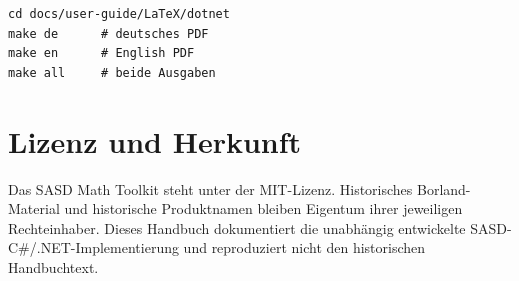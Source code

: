 \documentclass[11pt,a4paper,twoside,openright]{book}
\begin{document}
\begin{lstlisting}
cd docs/user-guide/LaTeX/dotnet
make de      # deutsches PDF
make en      # English PDF
make all     # beide Ausgaben
\end{lstlisting}

\backmatter
\chapter*{Lizenz und Herkunft}
Das SASD Math Toolkit steht unter der MIT-Lizenz. Historisches Borland-Material und historische Produktnamen bleiben Eigentum ihrer jeweiligen Rechteinhaber. Dieses Handbuch dokumentiert die unabhängig entwickelte SASD-C\#/.NET-Implementierung und reproduziert nicht den historischen Handbuchtext.
\end{document}
